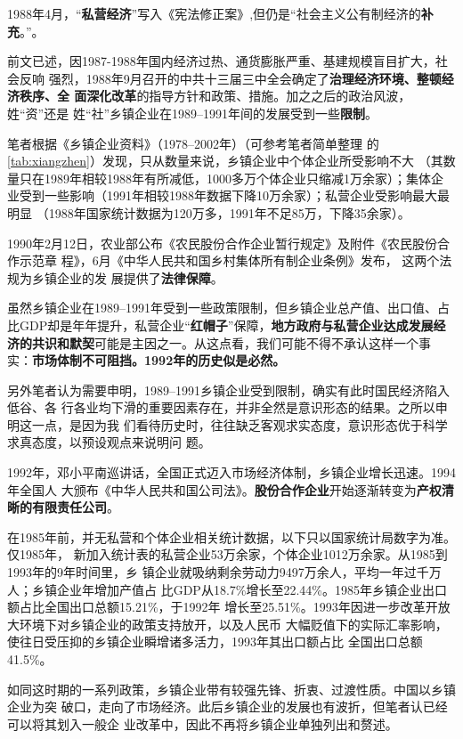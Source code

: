 1988年4月，“\textbf{私营经济}”写入《宪法修正案》,但仍是“社会主义公有制经济的\textbf{补
充}。”。

前文已述，因1987-1988年国内经济过热、通货膨胀严重、基建规模盲目扩大，社会反响
强烈，1988年9月召开的中共十三届三中全会确定了\textbf{治理经济环境、整顿经济秩序、全
  面深化改革}的指导方针和政策、措施。加之之后的政治风波，姓“资”还是
姓“社”乡镇企业在1989--1991年间的发展受到一些\textbf{限制}。

笔者根据《乡镇企业资料》（1978--2002年）（可参考笔者简单整理
的\cref{tab:xiangzhen}）发现，只从数量来说，乡镇企业中个体企业所受影响不大
（其数量只在1989年相较1988年有所减低，1000多万个体企业只缩减1万余家）；集体企
业受到一些影响（1991年相较1988年数据下降10万余家）；私营企业受影响最大最明显
（1988年国家统计数据为120万多，1991年不足85万，下降35余家）。

1990年2月12日，农业部公布《农民股份合作企业暂行规定》及附件《农民股份合作示范章
程》，6月《中华人民共和国乡村集体所有制企业条例》发布， 这两个法规为乡镇企业的发
展提供了\textbf{法律保障}。

虽然乡镇企业在1989--1991年受到一些政策限制，但乡镇企业总产值、出口值、占
比GDP却是年年提升，私营企业“\textbf{红帽子}”保障，\textbf{地方政府与私营企业达成发展经
  济的共识和默契}可能是主因之一。从这点看，我们可能不得不承认这样一个事
实：\textbf{市场体制不可阻挡。1992年的历史似是必然。}

另外笔者认为需要申明，1989--1991乡镇企业受到限制，确实有此时国民经济陷入低谷、各
行各业均下滑的重要因素存在，并非全然是意识形态的结果。之所以申明这一点，是因为我
们看待历史时，往往缺乏客观求实态度，意识形态优于科学求真态度，以预设观点来说明问
题。

1992年，邓小平南巡讲话，全国正式迈入市场经济体制，乡镇企业增长迅速。1994年全国人
大颁布《中华人民共和国公司法》。\textbf{股份合作企业}开始逐渐转变为\textbf{产权清
  晰的有限责任公司}。

在1985年前，并无私营和个体企业相关统计数据，以下只以国家统计局数字为准。仅1985年，
新加入统计表的私营企业53万余家，个体企业1012万余家。从1985到1993年的9年时间里，乡
镇企业就吸纳剩余劳动力9497万余人，平均一年过千万人；乡镇企业年增加产值占
比GDP从18.7\%增长至22.44\%。1985年乡镇企业出口额占比全国出口总额15.21\%，于1992年
增长至25.51\%。1993年因进一步改革开放大环境下对乡镇企业的政策支持放开，以及人民币
大幅贬值下的实际汇率影响，使往日受压抑的乡镇企业瞬增诸多活力，1993年其出口额占比
全国出口总额41.5\%。

如同这时期的一系列政策，乡镇企业带有较强先锋、折衷、过渡性质。中国以乡镇企业为突
破口，走向了市场经济。此后乡镇企业的发展也有波折，但笔者认已经可以将其划入一般企
业改革中，因此不再将乡镇企业单独列出和赘述。

